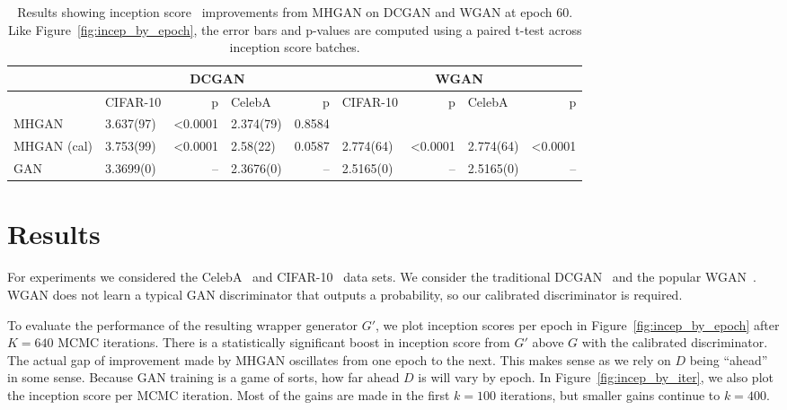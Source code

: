 \documentclass{article}
\begin{document}
\begin{table}[htbp]
\centering
    \caption{{\small
    Results showing inception score~\citep{Salimans2016} improvements from MHGAN on DCGAN and WGAN at epoch 60.
    Like Figure~\ref{fig:incep_by_epoch}, the error bars and p-values are computed using a paired t-test across inception score batches.
    }}
    \label{tbl:inception}
{\scriptsize
\begin{tabular}{|l|l|r|l|r||l|r|l|r|}
\toprule
~                 & \multicolumn{4}{c}{DCGAN}                               & \multicolumn{4}{c}{WGAN} \\
\toprule
~                 & CIFAR-10         &      p   & CelebA         &      p   & CIFAR-10        &       p   & CelebA        &       p  \\
\midrule
MHGAN              &        3.637(97) &  <0.0001 &      2.374(79) &  0.8584  &              ~  &        ~  &            ~  &      ~   \\
MHGAN (cal)        &        3.753(99) &  <0.0001 &      2.58(22)  &  0.0587  &       2.774(64)  &  <0.0001 &     2.774(64) &  <0.0001 \\
GAN               &        3.3699(0) &       -- &      2.3676(0) &      --  &       2.5165(0) &        -- &     2.5165(0) &       -- \\
\bottomrule
\end{tabular}
}
\end{table}


\section{Results}
\label{sec:Results}

For experiments we considered the CelebA~\citep{Liu2015} and CIFAR-10~\citep{Torralba2008} data sets.
We consider the traditional DCGAN~\citep{Radford2015} and the popular WGAN~\citep{Arjovsky2017}\@.
WGAN does not learn a typical GAN discriminator that outputs a probability, so our calibrated discriminator is required.


To evaluate the performance of the resulting wrapper generator $G'$, we plot inception scores per epoch in Figure~\ref{fig:incep_by_epoch} after $K=640$ MCMC iterations.
There is a statistically significant boost in inception score from $G'$ above $G$ with the calibrated discriminator.
The actual gap of improvement made by MHGAN oscillates from one epoch to the next.
This makes sense as we rely on $D$ being ``ahead'' in some sense.
Because GAN training is a game of sorts, how far ahead $D$ is will vary by epoch.
In Figure~\ref{fig:incep_by_iter}, we also plot the inception score per MCMC iteration.
Most of the gains are made in the first $k=100$ iterations, but smaller gains continue to $k=400$.
\end{document}
